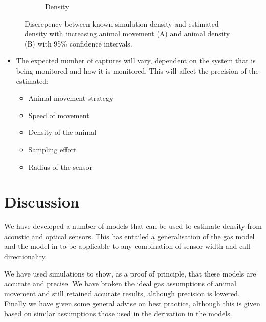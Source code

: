 \documentclass[a4paper,10pt,reqno,oneside]{amsart}
\begin{document}
\begin{figure}[t]
\begin{subfigure}[t]{0.5\textwidth}
                \caption{Density}
                \label{f:Density}
        \end{subfigure}
	\caption{Discrepency between known simulation density and estimated density with increasing animal movement (A) and animal density (B) with 95\% confidence intervals.}
	\label{}
\end{figure}

\begin{itemize}
\item The expected number of captures will vary, dependent on the system that is being monitored and how it is monitored. This will affect the precision of the estimated: 
	\begin{itemize}
	\item Animal movement strategy
	\item Speed of movement
	\item Density of the animal
	\item Sampling effort
	\item Radius of the sensor
	\end{itemize}
\end{itemize}


\section{Discussion}


We have developed a number of models that can be used to estimate density from acoustic and optical sensors. This has entailed a generalisation of the gas model and the model in \cite{rowcliffe2008estimating} to be applicable to any combination of sensor width and call directionality. 

We have used simulations to show, as a proof of principle, that these models are accurate and precise. We have broken  the ideal gas assumptions of animal movement and still retained accurate results, although precision is lowered. Finally we have given some general advise on best practice, although this is given based on similar assumptions those used in the derivation in the models.
\end{document}

